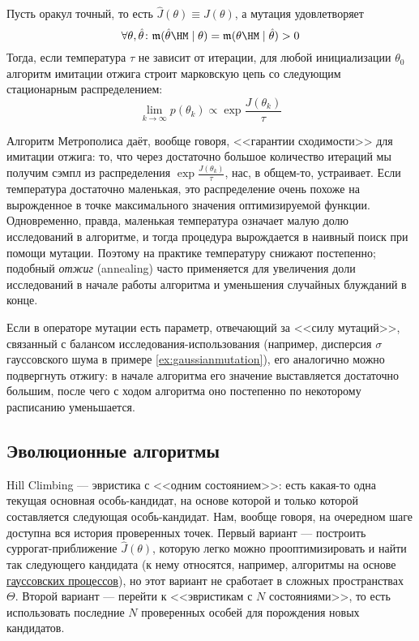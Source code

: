 \begin{proposition}
Пусть оракул точный, то есть $\hat{J}(\theta) \equiv J(\theta)$, а мутация удовлетворяет
$$\forall \theta, \hat{\theta} \colon \mut(\hat{\theta} \HM\mid \theta) = \mut(\theta \HM\mid \hat{\theta}) > 0$$
Тогда, если температура $\tau$ не зависит от итерации, для любой инициализации $\theta_0$ алгоритм имитации отжига строит марковскую цепь со следующим стационарным распределением:
$$\lim_{k \to \infty} p(\theta_k) \propto \exp \frac{J(\theta_k)}{\tau}$$
\end{proposition}

Алгоритм Метрополиса даёт, вообще говоря, <<гарантии сходимости>> для имитации отжига: то, что через достаточно большое количество итераций мы получим сэмпл из распределения $\exp \frac{J(\theta_k)}{\tau}$, нас, в общем-то, устраивает. Если температура достаточно маленькая, это распределение очень похоже на вырожденное в точке максимального значения оптимизируемой функции. Одновременно, правда, маленькая температура означает малую долю исследований в алгоритме, и тогда процедура вырождается в наивный поиск при помощи мутации. Поэтому на практике температуру снижают постепенно; подобный \emph{отжиг} (annealing) часто применяется для увеличения доли исследований в начале работы алгоритма и уменьшения случайных блужданий в конце.

\begin{example}
\begin{center}
\end{center}
\end{example}

\begin{remark}
Если в операторе мутации есть параметр, отвечающий за <<силу мутаций>>, связанный с балансом исследования-использования (например, дисперсия $\sigma$ гауссовского шума в примере \ref{ex:gaussianmutation}), его аналогично можно подвергнуть отжигу: в начале алгоритма его значение выставляется достаточно большим, после чего с ходом алгоритма оно постепенно по некоторому расписанию уменьшается.
\end{remark}

\subsection{Эволюционные алгоритмы}

Hill Climbing --- эвристика с <<одним состоянием>>: есть какая-то одна текущая основная особь-кандидат, на основе которой и только которой составляется следующая особь-кандидат. Нам, вообще говоря, на очередном шаге доступна вся история проверенных точек. Первый вариант --- построить суррогат-приближение $\hat{J}(\theta)$, которую легко можно прооптимизировать и найти так следующего кандидата (к нему относятся, например, алгоритмы на основе \href{https://distill.pub/2020/bayesian-optimization/}{гауссовских процессов}), но этот вариант не сработает в сложных пространствах $\Theta$. Второй вариант --- перейти к <<эвристикам с $N$ состояниями>>, то есть использовать последние $N$ проверенных особей для порождения новых кандидатов.

